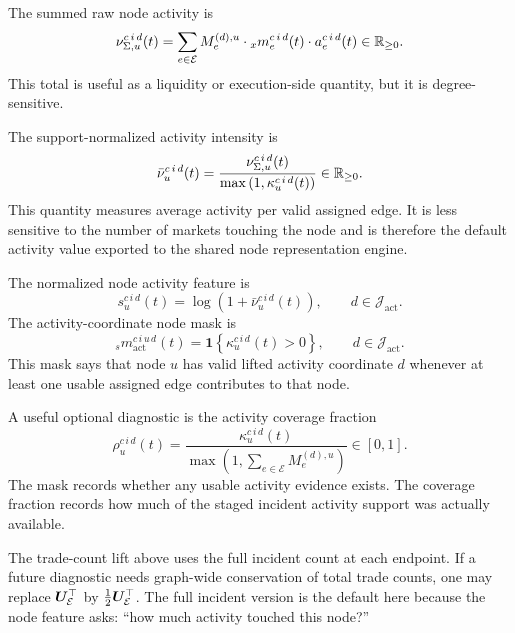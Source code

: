 The summed raw node activity is
\[
  \nu_{\Sigma,u}^{c\,i\,d}(t)
  =
  \sum_{e\in\mathcal{E}}
  M_{e}^{(d),u}
  \cdot
  {}_{x}m_{e}^{c\,i\,d}(t)
  \cdot
  a_{e}^{c\,i\,d}(t)
  \in
  \mathbb{R}_{\ge 0}.
\]
This total is useful as a liquidity or execution-side quantity, but it is
degree-sensitive.

The support-normalized activity intensity is
\[
  \bar{\nu}_{u}^{c\,i\,d}(t)
  =
  \frac{
    \nu_{\Sigma,u}^{c\,i\,d}(t)
  }{
    \max
    \left(
      1,
      \kappa_{u}^{c\,i\,d}(t)
    \right)
  }
  \in
  \mathbb{R}_{\ge 0}.
\]
This quantity measures average activity per valid assigned edge.  It is less
sensitive to the number of markets touching the node and is therefore the
default activity value exported to the shared node representation engine.

The normalized node activity feature is
\[
  s_u^{c\,i\,d}(t)
  =
  \log
  \left(
    1+\bar{\nu}_{u}^{c\,i\,d}(t)
  \right),
  \qquad
  d\in\mathcal{J}_{\mathrm{act}}.
\]
The activity-coordinate node mask is
\[
  {}_{s}m_{\mathrm{act}}^{c\,i\,u\,d}(t)
  =
  \mathbf{1}
  \left\{
    \kappa_{u}^{c\,i\,d}(t)>0
  \right\},
  \qquad
  d\in\mathcal{J}_{\mathrm{act}}.
\]
This mask says that node $u$ has valid lifted activity coordinate $d$ whenever
at least one usable assigned edge contributes to that node.

A useful optional diagnostic is the activity coverage fraction
\[
  \rho_{u}^{c\,i\,d}(t)
  =
  \frac{
    \kappa_{u}^{c\,i\,d}(t)
  }{
    \max
    \left(
      1,
      \sum_{e\in\mathcal{E}}M_{e}^{(d),u}
    \right)
  }
  \in[0,1].
\]
The mask records whether any usable activity evidence exists.  The coverage
fraction records how much of the staged incident activity support was actually
available.

The trade-count lift above uses the full incident count at each endpoint.  If a
future diagnostic needs graph-wide conservation of total trade counts, one may
replace $\bm{U}_{\mathcal{E}}^{\top}$ by
$\frac{1}{2}\bm{U}_{\mathcal{E}}^{\top}$.  The full incident version is the
default here because the node feature asks: ``how much activity touched this
node?''


